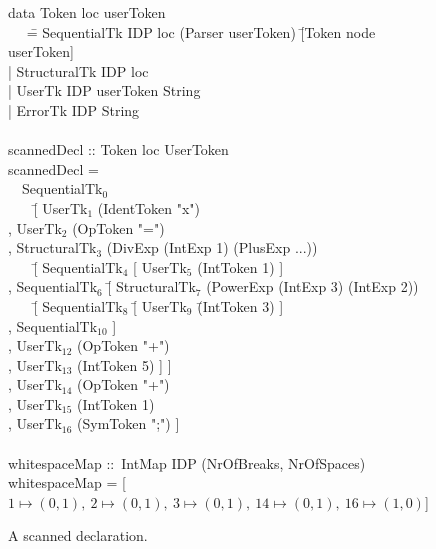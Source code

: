 \documentclass{article}[10pt]
\begin{document}
\begin{figure}
\begin{footnotesize}
\begin{tabbedCode}
data Token loc userToken \\
~~ \= = SequentialTk    IDP loc (Parser userToken) \= [Token node userToken]\\
   \> | StructuralTk IDP loc                    \\
   \> | UserTk       IDP userToken String \\
   \> | ErrorTk      IDP String \\
\\
scannedDecl :: Token loc UserToken\\
scannedDecl = \\
~~SequentialTk$_0$ \= \\
~~~ \= [ UserTk$_1$ (IdentToken "x") \\
   \> , UserTk$_2$ (OpToken "=") \\
   \> , StructuralTk$_3$ (DivExp (IntExp 1) (PlusExp ...))\\
   \> ~~~ \= [ SequentialTk$_4$ [ UserTk$_5$ (IntToken 1) ] \\
   \>      \> , SequentialTk$_6$ \= [ StructuralTk$_7$ (PowerExp (IntExp 3) (IntExp 2))\\
   \>      \>              \> ~~~ \= [ SequentialTk$_8$    \= [ UserTk$_9$ \= (IntToken 3) ] \\
   \>      \>              \>      \> , SequentialTk$_{10}$  ]\\
   \>      \>              \> , UserTk$_{12}$ (OpToken "+") \\
   \>      \>              \> , UserTk$_{13}$ (IntToken 5) ] ] \\
   \> , UserTk$_{14}$ (OpToken "+") \\
   \> , UserTk$_{15}$ (IntToken 1) \\
   \> , UserTk$_{16}$ (SymToken ";") ]\\
\\
whitespaceMap ::~IntMap IDP (NrOfBreaks, NrOfSpaces)\\
whitespaceMap = [$1 \mapsto (0,1),~2 \mapsto (0,1),~3 \mapsto (0,1),~14 \mapsto (0,1),~16 \mapsto (1,0)$]
\end{tabbedCode}
\end{footnotesize}
\caption{A scanned declaration.} \label{fig:scanResult} 
\end{figure}
\end{document}

